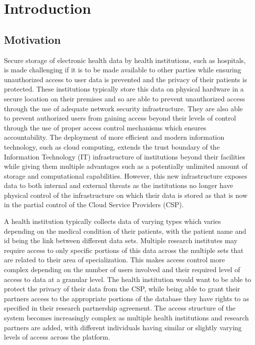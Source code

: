 \chapter{Introduction}
\label{chap:introduction}


\section{Motivation}

Secure storage of electronic health data by health institutions, such as hospitals, is made challenging if it is to be made available to other parties while ensuring unauthorized access to user data is prevented and the privacy of their patients is protected. These institutions typically store this data on physical hardware in a secure location on their premises and so are able to prevent unauthorized access through the use of adequate network security infrastructure. They are also able to prevent authorized users from gaining access beyond their levels of control through the use of proper access control mechanisms which ensures accountability. The deployment of more efficient and modern information technology, such as cloud computing, extends the trust boundary of the Information Technology (IT) infrastructure of institutions beyond their facilities while giving them multiple advantages such as a potentially unlimited amount of storage and computational capabilities. However, this new infrastructure exposes data to both internal and external threats as the institutions no longer have physical control of the infrastructure on which their data is stored as that is now in the partial control of the Cloud Service Providers (CSP).

A health institution typically collects data of varying types which varies depending on the medical condition of their patients, with the patient name and id being the link between different data sets. Multiple research institutes may require access to only specific portions of this data across the multiple sets that are related to their area of specialization. This makes access control more complex depending on the number of users involved and their required level of access to data at a granular level. The health institution would want to be able to protect the privacy of their data from the CSP, while being able to grant their partners access to the appropriate portions of the database they have rights to as specified in their research partnership agreement. The access structure of the system becomes increasingly complex as multiple health institutions and research partners are added, with different individuals having similar or slightly varying levels of access across the platform.

